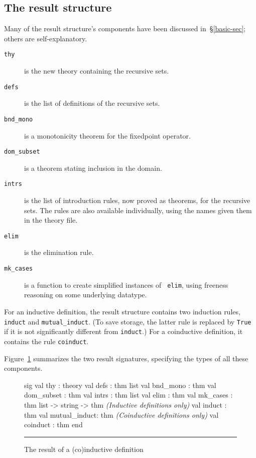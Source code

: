 \subsection{The result structure}
Many of the result structure's components have been discussed
in~\S\ref{basic-sec}; others are self-explanatory.
\begin{description}
\item[\tt thy] is the new theory containing the recursive sets.

\item[\tt defs] is the list of definitions of the recursive sets.

\item[\tt bnd\_mono] is a monotonicity theorem for the fixedpoint operator.

\item[\tt dom\_subset] is a theorem stating inclusion in the domain.

\item[\tt intrs] is the list of introduction rules, now proved as theorems, for
the recursive sets.  The rules are also available individually, using the
names given them in the theory file. 

\item[\tt elim] is the elimination rule.

\item[\tt mk\_cases] is a function to create simplified instances of {\tt
elim}, using freeness reasoning on some underlying datatype.
\end{description}

For an inductive definition, the result structure contains two induction rules,
{\tt induct} and \verb|mutual_induct|.  (To save storage, the latter rule is
replaced by {\tt True} if it is not significantly different from
{\tt induct}.)  For a coinductive definition, it
contains the rule \verb|coinduct|.

Figure~\ref{def-result-fig} summarizes the two result signatures,
specifying the types of all these components.

\begin{figure}
\begin{ttbox}
sig
val thy          : theory
val defs         : thm list
val bnd_mono     : thm
val dom_subset   : thm
val intrs        : thm list
val elim         : thm
val mk_cases     : thm list -> string -> thm
{\it(Inductive definitions only)} 
val induct       : thm
val mutual_induct: thm
{\it(Coinductive definitions only)}
val coinduct    : thm
end
\end{ttbox}
\hrule
\caption{The result of a (co)inductive definition} \label{def-result-fig}
\end{figure}

